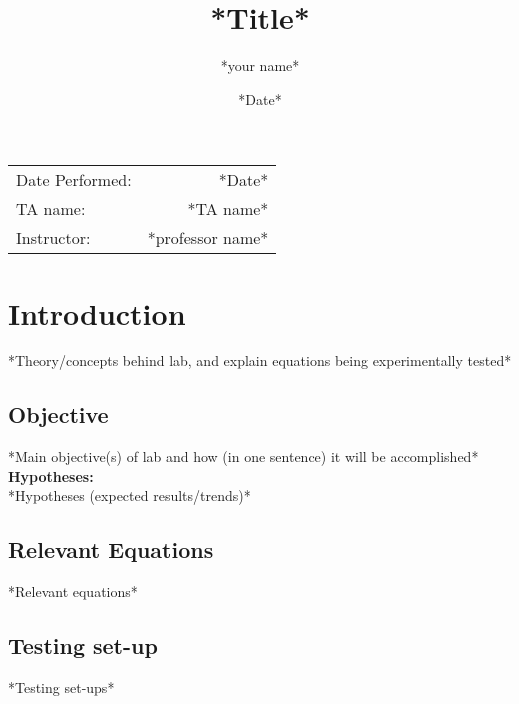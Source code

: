 \documentclass[
	letterpaper, %
	10pt, %
]{labby boi}
\title{*Title*
} %
\author{*your name*} %
\date{*Date*} %
\begin{document}
\maketitle %

\begin{center}
	\begin{tabular}{l r}
		Date Performed: & *Date* \\ %
		TA name: & *TA name* \\ %
		Instructor: & *professor name* %
	\end{tabular}
\end{center}



\vspace{5in}
\section{Introduction}
*Theory/concepts behind lab, and explain equations being experimentally tested*
\subsection{Objective}
*Main objective(s) of lab and how (in one sentence) it will be accomplished*\\
\textbf{Hypotheses:}\\
*Hypotheses (expected results/trends)*
\subsection{Relevant Equations}
*Relevant equations*
\subsection{Testing set-up}
*Testing set-ups*
\end{document}
